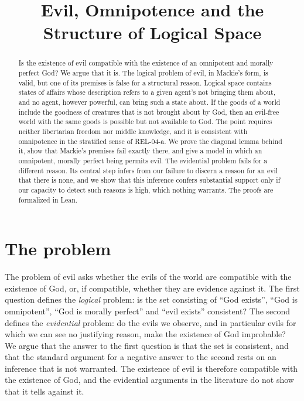 \documentclass{situationist-preprint}
\title{Evil, Omnipotence and the Structure of Logical Space}
\begin{document}
\maketitle

\begin{abstract}
Is the existence of evil compatible with the existence of an omnipotent and morally perfect God? We argue that it is. The logical problem of evil, in Mackie's form, is valid, but one of its premises is false for a structural reason. Logical space contains states of affairs whose description refers to a given agent's not bringing them about, and no agent, however powerful, can bring such a state about. If the goods of a world include the goodness of creatures that is not brought about by God, then an evil-free world with the same goods is possible but not available to God. The point requires neither libertarian freedom nor middle knowledge, and it is consistent with omnipotence in the stratified sense of REL-04-a. We prove the diagonal lemma behind it, show that Mackie's premises fail exactly there, and give a model in which an omnipotent, morally perfect being permits evil. The evidential problem fails for a different reason. Its central step infers from our failure to discern a reason for an evil that there is none, and we show that this inference confers substantial support only if our capacity to detect such reasons is high, which nothing warrants. The proofs are formalized in Lean.
\end{abstract}

\section{The problem}

The problem of evil asks whether the evils of the world are compatible with the existence of God, or, if compatible, whether they are evidence against it. The first question defines the \emph{logical} problem: is the set consisting of \enquote{God exists}, \enquote{God is omnipotent}, \enquote{God is morally perfect} and \enquote{evil exists} consistent? The second defines the \emph{evidential} problem: do the evils we observe, and in particular evils for which we can see no justifying reason, make the existence of God improbable? We argue that the answer to the first question is that the set is consistent, and that the standard argument for a negative answer to the second rests on an inference that is not warranted. The existence of evil is therefore compatible with the existence of God, and the evidential arguments in the literature do not show that it tells against it.
\end{document}

